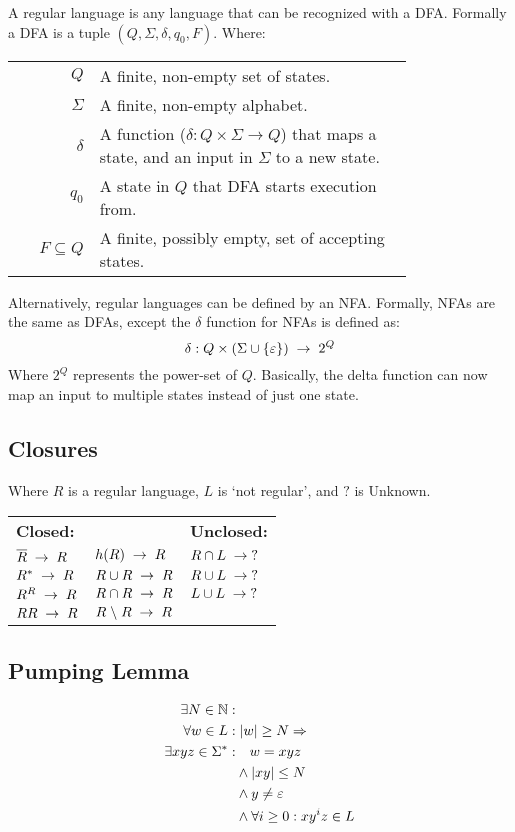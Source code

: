 A regular language is any language that can be recognized with a DFA.
Formally a DFA is a tuple $(Q,\Sigma,\delta,q_0,F)$. Where:

\begin{tabular}{rp{0.79\linewidth}}
$Q$             & A finite, non-empty set of states. \\
$\Sigma$        & A finite, non-empty alphabet. \\
$\delta$        & A function ($\delta : Q \times \Sigma \to Q$) that maps
                  a state, and an input in $\Sigma$ to a new state. \\
$q_0$           & A state in $Q$ that DFA starts execution from. \\
$F \subseteq Q$ & A finite, possibly empty, set of accepting states.
\end{tabular}
Alternatively, regular languages can be defined by an NFA. Formally, NFAs are
the same as DFAs, except the $\delta$ function for NFAs is defined as:
\[
    \delta : Q \times (\Sigma \cup \{\varepsilon\}) \;\to\; 2^Q
\]
Where $2^Q$ represents the power-set of $Q$. Basically, the delta function can
now map an input to multiple states instead of just one state.

\subsection{Closures}
Where $R$ is a regular language, $L$ is `not regular', and $?$ is Unknown.

\settowidth{\templength}{$R \cap R \spto R$}
\addtolength{\templength}{1cm}
\begin{tabular}{lp{\templength}l}
\textbf{Closed:}       &                    & \textbf{Unclosed:} \\
$\overline{R} \;\to\; R$ & $h(R) \;\to\; R$     & $R \cap L \;\to\; ?$ \\
$R^* \;\to\; R$          & $R \cup R \;\to\; R$ & $R \cup L \;\to\; ?$\\
$R^R \;\to\; R$          & $R \cap R \spto R$ & $L \cup L \;\to\; ?$\\
$RR \;\to\; R$           & $R \;\backslash\; R \;\to\; R$ & \\
\end{tabular}

\subsection{Pumping Lemma}
\begin{align*}
\exists N \in \mathbb{N}: & \\
         \forall w \in L: &\; |w| \geq N \Rightarrow \\
\exists xyz \in \Sigma^*: & \quad w = xyz \\
                          & \land |xy| \leq N \\
                          & \land y \neq \varepsilon \\
                          & \land \forall i \geq 0: xy^iz \in L
\end{align*}
